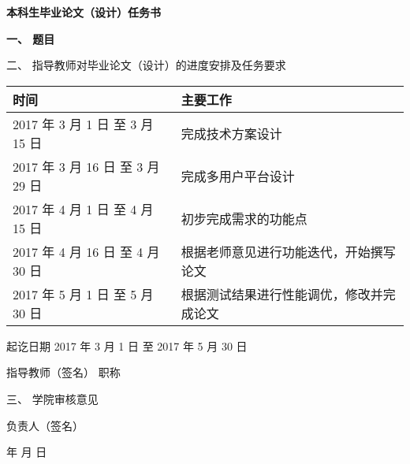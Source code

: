 {
  \setlength{\parindent}{0em}
  \linespread{1}

  \vspace*{-2.2em}

  {
    \centering
    \songti\erhao\bfseries
    本科生毕业论文（设计）任务书 \par
  }

  \vspace{2.1em}

  {
    \renewcommand\arraystretch{1.7}
    \songti\xiaosi\bfseries
    一、 \; 题目 \; \underline{\makebox{\zjutitlec}}

    \vspace{1.1em}

    二、 \; 指导教师对毕业论文（设计）的进度安排及任务要求
    \begin{table}[!htbp]
      \centering
      \begin{tabular}{|l|l|}
      \hline
      时间 & 主要工作 \\ \hline
      2017 年 3 月 1 日 至 3 月 15 日& 完成技术方案设计 \\ \hline
      2017 年 3 月 16 日 至 3 月 29 日& 完成多用户平台设计 \\ \hline
      2017 年 4 月 1 日 至 4 月 15 日& 初步完成需求的功能点 \\ \hline
      2017 年 4 月 16 日 至 4 月 30 日& 根据老师意见进行功能迭代，开始撰写论文 \\ \hline
      2017 年 5 月 1 日 至 5 月 30 日& 根据测试结果进行性能调优，修改并完成论文 \\ \hline      
      \end{tabular}
    \end{table}
    \vspace{2em}

    \hfill 起讫日期 \hspace{1em} 2017 年 \hspace{0.5em} 3 月 \hspace{0.5em} 1 日 \; 至 \hspace{0.5em} 2017 年 \hspace{0.5em} 5 月 \hspace{0.5em} 30 日

    \vspace{1.3em}

    \hfill 指导教师（签名） \; \underline{\hspace{4em}} \; 职称 \; \underline{\hspace{4em}}

    \vspace{2.35em}

    三、 \; 学院审核意见

    \vspace{13.95em}

    \hfill 负责人（签名） \; \underline{\hspace{4em}}

    \vspace{1.3em}

    \hfill \hspace{2em} 年 \hspace{1em} 月 \hspace{1em} 日 \par
  }
}
